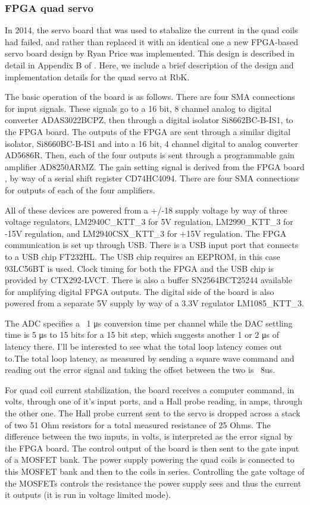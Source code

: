 \subsubsection{FPGA quad servo}
In 2014, the servo board that was used to stabalize the current in the quad coils had failed, and rather than replaced it with an identical one a new FPGA-based servo board design by Ryan Price was implemented. This design is described in detail in Appendix B of \cite{PriceThesis}. Here, we include a brief description of the design and implementation details for the quad servo at RbK.

The basic operation of the board is as follows. There are four SMA connections for input signals. These signals go to a 16 bit, 8 channel analog to digital converter ADAS3022BCPZ, then through a digital isolator Si8662BC-B-IS1, to the FPGA board. The outputs of the FPGA are sent through a similar digital isolator, Si8660BC-B-IS1 and into a 16 bit, 4 channel digital to analog converter AD5686R. Then, each of the four outputs is sent through a programmable gain amplifier AD8250ARMZ. The gain setting signal is derived from the FPGA board , by way of a serial shift register  CD74HC4094. There are four SMA connections for outputs of each of the four amplifiers.  

All of these devices are powered from a +/-18 supply voltage by way of three voltage regulators, LM2940C\_KTT\_3 for 5V regulation, LM2990\_KTT\_3 for -15V regulation, and LM2940CSX\_KTT\_3 for +15V regulation. The FPGA communication is set up through USB. There is a USB input port that connects to a USB chip FT232HL. The USB chip requires an EEPROM, in this case 93LC56BT is used.    Clock timing for both the FPGA and the USB chip is provided by  CTX292-LVCT. There is also a buffer SN2564BCT25244 available for amplifying digital FPGA outputs. The digital side of the board is also powered from a separate 5V supply by way of a 3.3V regulator LM1085\_KTT\_3. 

The ADC specifies a ~1 μs conversion time per channel while the DAC settling time is 5 μs to 15 bits for a 15 bit step, which suggests another 1 or 2 μs of latency there. I’ll be interested to see what the total loop latency comes out to.The total loop latency, as measured by sending a square wave command and reading out the error signal and taking the offset between the two is ~8us. 

For quad coil current stabilization, the board receives a computer command, in volts, through one of it's input ports, and a Hall probe reading, in amps, through the other one.  The Hall probe current sent to the servo is dropped across a stack of two 51 Ohm resistors for a total measured resistance of 25 Ohms. The difference between the two inputs, in volts, is interpreted as the error signal by the FPGA board. The control output of the board is then sent to the gate input of a MOSFET bank. The power supply powering the quad coils is connected to this MOSFET bank and then to the coils in series. Controlling the gate voltage of the MOSFETs controls the resistance the power supply sees and thus the current it outputs (it is run in voltage limited mode).  

